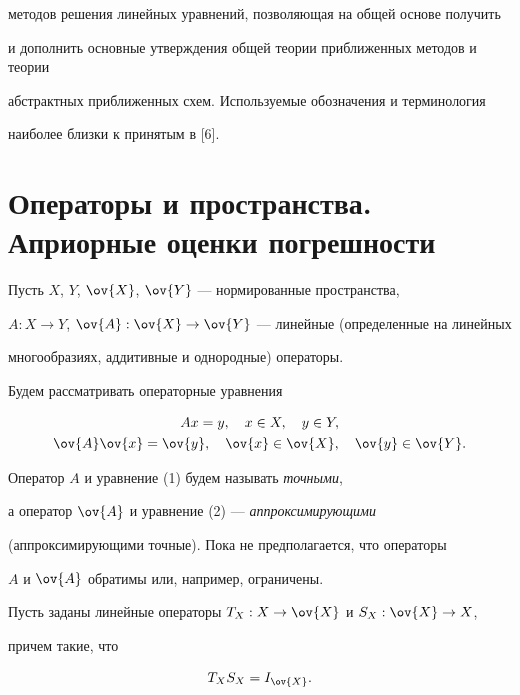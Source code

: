 методов решения линейных уравнений, позволяющая на общей основе получить


и дополнить основные утверждения общей теории приближенных методов и теории


абстрактных приближенных схем. Используемые обозначения и терминология


наиболее близки к принятым в [6].





\section{Операторы и пространства. Априорные оценки погрешности}





Пусть $X$, $Y$, $\ov{X}$, $\ov{Y}$ --- нормированные пространства,


$A:X\to Y$, $\ov{A}:\ov{X}\to\ov{Y}$ --- линейные (определенные на линейных


многообразиях, аддитивные и однородные) операторы.


Будем рассматривать операторные уравнения


\begin{gather}


Ax = y, \quad x\in X,\quad y\in Y, \\


%


\ov{A}\ov{x} = \ov{y}, \quad \ov{x}\in \ov{X},\quad \ov{y}\in \ov{Y}.


\end{gather}


Оператор $A$ и уравнение (1) будем называть {\em точными},


а оператор $\ov{A}$ и уравнение (2) --- {\em аппроксимирующими}


(аппроксимирующими точные). Пока не предполагается, что операторы


$A$ и $\ov{A}$ обратимы или, например, ограничены.





Пусть заданы линейные операторы $T_X: X\to\ov{X}$ и $S_X: \ov{X}\to X$,


причем такие, что


\begin{equation}


T_X S_X = I_{\ov{X}}.


\end{equation}


